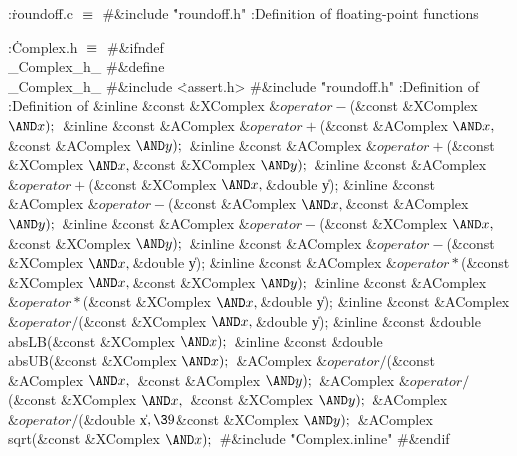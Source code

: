 \B{}:\.{roundoff.c }\X${}\equiv{}$\6
\8\#\&{include} \.{"roundoff.h"}\6
:Definition of floating-point functions\X\par
\fi

\B{}:\.{Complex.h }\X${}\equiv{}$\6
\8\#\&{ifndef} \\{\_Complex\_h\_}\6
\8\#\&{define} \\{\_Complex\_h\_}\6
\8\#\&{include} \.{<assert.h>}\6
\8\#\&{include} \.{"roundoff.h"}\6
:Definition of \X\6
:Definition of \X\7
\&{inline} \&{const} \&{XComplex} ${}\&{operator}{-}{}$(\&{const} \&{XComplex}
${}{\AND}\|x);{}$\6
\&{inline} \&{const} \&{AComplex} ${}\&{operator}{+}{}$(\&{const} \&{AComplex}
${}{\AND}\|x,\39{}$\&{const} \&{AComplex} ${}{\AND}\|y);{}$\6
\&{inline} \&{const} \&{AComplex} ${}\&{operator}{+}{}$(\&{const} \&{XComplex}
${}{\AND}\|x,\39{}$\&{const} \&{XComplex} ${}{\AND}\|y);{}$\6
\&{inline} \&{const} \&{AComplex} ${}\&{operator}{+}{}$(\&{const} \&{XComplex}
${}{\AND}\|x,\39{}$\&{double} \|y);\6
\&{inline} \&{const} \&{AComplex} ${}\&{operator}{-}{}$(\&{const} \&{AComplex}
${}{\AND}\|x,\39{}$\&{const} \&{AComplex} ${}{\AND}\|y);{}$\6
\&{inline} \&{const} \&{AComplex} ${}\&{operator}{-}{}$(\&{const} \&{XComplex}
${}{\AND}\|x,\39{}$\&{const} \&{XComplex} ${}{\AND}\|y);{}$\6
\&{inline} \&{const} \&{AComplex} ${}\&{operator}{-}{}$(\&{const} \&{XComplex}
${}{\AND}\|x,\39{}$\&{double} \|y);\6
\&{inline} \&{const} \&{AComplex} ${}\&{operator}*{}$(\&{const} \&{XComplex}
${}{\AND}\|x,\39{}$\&{const} \&{XComplex} ${}{\AND}\|y);{}$\6
\&{inline} \&{const} \&{AComplex} ${}\&{operator}*{}$(\&{const} \&{XComplex}
${}{\AND}\|x,\39{}$\&{double} \|y);\6
\&{inline} \&{const} \&{AComplex} ${}\&{operator}{/}{}$(\&{const} \&{XComplex}
${}{\AND}\|x,\39{}$\&{double} \|y);\6
\&{inline} \&{const} \&{double} \\{absLB}(\&{const} \&{XComplex} ${}{\AND}%
\|x);{}$\6
\&{inline} \&{const} \&{double} \\{absUB}(\&{const} \&{XComplex} ${}{\AND}%
\|x);{}$\6
\&{AComplex} ${}\&{operator}{/}{}$(\&{const} \&{AComplex} ${}{\AND}\|x,\39{}$%
\&{const} \&{AComplex} ${}{\AND}\|y);{}$\6
\&{AComplex} ${}\&{operator}{/}{}$(\&{const} \&{XComplex} ${}{\AND}\|x,\39{}$%
\&{const} \&{XComplex} ${}{\AND}\|y);{}$\6
\&{AComplex} ${}\&{operator}{/}{}$(\&{double} \|x${},\39{}$\&{const} %
\&{XComplex} ${}{\AND}\|y);{}$\6
\&{AComplex} \\{sqrt}(\&{const} \&{XComplex} ${}{\AND}\|x);{}$\6
\8\#\&{include} \.{"Complex.inline"}\6
\8\#\&{endif}\par
\fi

